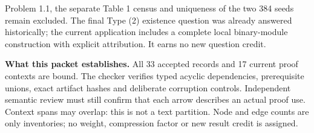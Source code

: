 \documentclass[11pt]{article}
\begin{document}
Problem 1.1, the separate Table 1 census and uniqueness of the two 384 seeds
remain excluded. The final Type (2) existence question was already answered
historically; the current application includes a complete local binary-module
construction with explicit attribution. It earns no new question credit.

\textbf{What this packet establishes.}
All 33 accepted records and 17 current proof contexts are bound. The checker
verifies typed acyclic dependencies, prerequisite unions, exact artifact
hashes and deliberate corruption controls. Independent semantic review must
still confirm that each arrow describes an actual proof use. Context spans
may overlap: this is not a text partition. Node and edge counts are only
inventories; no weight, compression factor or new result credit is assigned.
\end{document}
